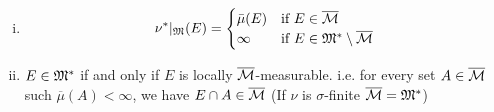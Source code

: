 \begin{theorem}
  \begin{enumerate}[(i)]
    \item \[\nu^*|_{\mathfrak M}(E) = \begin{cases}
      \bar{\mu}(E) & \text{if } E \in \overline{\mathcal M}\\
      \infty & \text{if } E \in \mathfrak M^* \setminus \overline{\mathcal M}
    \end{cases}\]
    \item $E \in \mathfrak M^*$ if and only if $E$ is locally $\overline{\mathcal M}$-measurable.
    i.e. for every set $A \in \overline{\mathcal M}$ such $\overline{\mu}(A) < \infty$, we have $E \cap A \in \overline{\mathcal M}$
    (If $\nu$ is $\sigma$-finite $\overline{\mathcal M} = \mathfrak M^*$)
  \end{enumerate}
\end{theorem}
